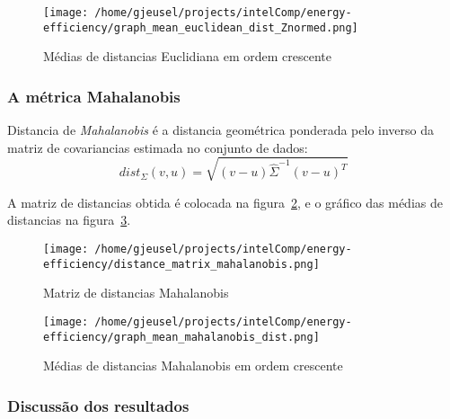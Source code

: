 \documentclass[paper=a4, fontsize=11pt]{article} %
\numberwithin{equation}{section} %
\numberwithin{figure}{section} %
\numberwithin{table}{section} %
\begin{document}
  \begin{figure}[H] %
  \begin{center}
  \texttt{[image: /home/gjeusel/projects/intelComp/energy-efficiency/graph\_mean\_euclidean\_dist\_Znormed.png]}
  \end{center}
  \caption{Médias de distancias Euclidiana em ordem crescente}
  \label{dist_eucl_graph}
  \end{figure}


\subsubsection{A métrica Mahalanobis}

Distancia de \emph{Mahalanobis} é a distancia geométrica ponderada pelo inverso da matriz de covariancias estimada no conjunto de dados:
\begin{equation}
dist_{\Sigma}(v,u) = \sqrt{(v-u)\hat{\Sigma}^{-1}(v-u)^T}
\end{equation}

A matriz de distancias obtida é colocada na figura~\ref{dist_maha_matrix}, e o gráfico das médias de distancias na figura~\ref{dist_maha_graph}.

  \begin{figure}[H] %
  \begin{center}
  \texttt{[image: /home/gjeusel/projects/intelComp/energy-efficiency/distance\_matrix\_mahalanobis.png]}
  \end{center}
  \caption{Matriz de distancias Mahalanobis}
  \label{dist_maha_matrix}
  \end{figure}

  \begin{figure}[H] %
  \begin{center}
  \texttt{[image: /home/gjeusel/projects/intelComp/energy-efficiency/graph\_mean\_mahalanobis\_dist.png]}
  \end{center}
  \caption{Médias de distancias Mahalanobis em ordem crescente}
  \label{dist_maha_graph}
  \end{figure}

\subsubsection{Discussão dos resultados}
\end{document}
